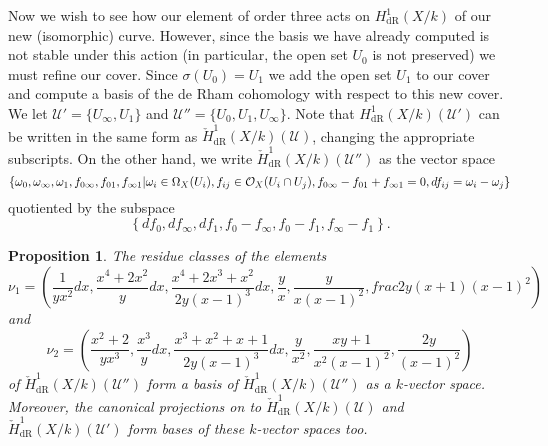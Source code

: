 \documentclass[draft, 11pt]{article} %
\theoremstyle{plain}
\newtheorem{prop}[defn]{Proposition}
\theoremstyle{remark}
\newcommand{\cO}{{\cal O}}
\newcommand{\cU}{{\mathcal U}}
\newcommand{\derhamhone}{H_{\text {dR}}^1(X/k)}
\newcommand{\cechderhamhone}{\check{H}_{\text {dR}}^1(X/k)}
\begin{document}
Now we wish to see how our element of order three acts on $\derhamhone$ of our new (isomorphic) curve.
However, since the basis we have already computed is not stable under this action (in particular, the open set $U_0$ is not preserved) we must refine our cover.
Since $\sigma(U_0) = U_1$ we add the open set $U_1$ to our cover and compute a basis of the de Rham cohomology with respect to this new cover.
We let $\cU' = \{ U_\infty, U_1\}$ and $\cU'' = \{U_0, U_1, U_\infty\}$.
Note that $\derhamhone(\cU')$ can be written in the same form as $\cechderhamhone(\cU)$, changing the appropriate subscripts.
On the other hand, we write $\cechderhamhone(\cU'')$ as the vector space
\[
\left\{ \omega_0, \omega_\infty , \omega_1, f_{0\infty}, f_{01},f_{\infty 1} | \omega_i \in \Omega_X(U_i), f_{ij} \in \cO_X(U_i \cap U_j), f_{0\infty} - f_{01} + f_{\infty1} = 0, df_{ij} = \omega_i - \omega_j \right\}
\]
quotiented by the subspace 
\[
\left\{ df_0, df_\infty, df_1, f_0- f_\infty, f_0 - f_1, f_\infty - f_1 \right\}.
\]
\begin{prop}
The residue classes of the elements 
\[
\nu_1 = \left(\frac{1}{yx^2}dx, \frac{x^4 + 2x^2}{y}dx, \frac{x^4 + 2x^3 +  x^2}{2y(x-1)^3}dx, \frac{y}{x}, \frac{y}{x(x-1)^2}, frac{2y(x+1)}{(x-1)^2} \right)
\]
and
\[
\nu_2 = \left( \frac{x^2 + 2}{yx^3}, \frac{x^3}{y}dx, \frac{x^3 + x^2 + x+ 1}{2y(x-1)^3}dx, \frac{y}{x^2}, \frac{xy +1}{x^2(x-1)^2}, \frac{2y}{(x-1)^2} \right)
\]
of $\cechderhamhone(\cU'')$ form a basis of $\cechderhamhone (\cU'')$ as a $k$-vector space.
Moreover, the canonical projections on to $\cechderhamhone(\cU)$ and $\cechderhamhone(\cU')$ form bases of these $k$-vector spaces too.
\end{prop}
\end{document}
